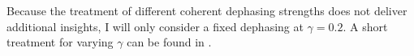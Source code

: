 Because the treatment of different coherent dephasing strengths does not deliver additional insights, I will only consider a fixed dephasing at $\gamma=0.2$. A short treatment for varying $\gamma$ can be found in .

